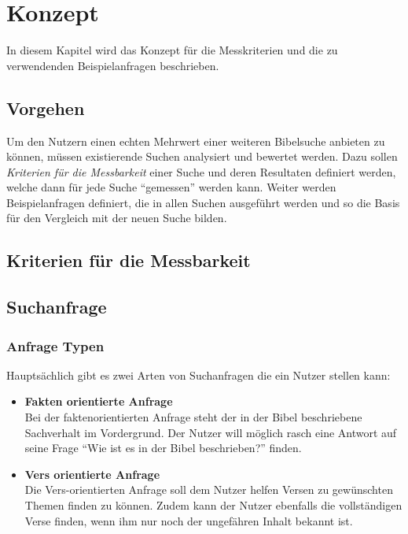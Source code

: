 \chapter{Konzept}
In diesem Kapitel wird das Konzept für die Messkriterien und die zu verwendenden Beispielanfragen beschrieben.

\section{Vorgehen}
Um den Nutzern einen echten Mehrwert einer weiteren Bibelsuche anbieten zu können, müssen existierende Suchen analysiert und bewertet werden.
Dazu sollen \textit{Kriterien für die Messbarkeit} einer Suche und deren Resultaten definiert werden, welche dann für jede Suche "`gemessen"' werden kann.
Weiter werden Beispielanfragen definiert, die in allen Suchen ausgeführt werden und so die Basis für den Vergleich mit der neuen Suche bilden.

\section{Kriterien für die Messbarkeit}

\section{Suchanfrage }

\subsection{Anfrage Typen}
Hauptsächlich gibt es zwei Arten von Suchanfragen die ein Nutzer stellen kann:
\begin{itemize}
	\item \textbf{Fakten orientierte Anfrage}\\
		Bei der faktenorientierten Anfrage steht der in der Bibel beschriebene Sachverhalt im Vordergrund. Der Nutzer will möglich rasch eine Antwort auf seine Frage "`Wie ist es in der Bibel beschrieben?"' finden.

	\item \textbf{Vers orientierte Anfrage}\\
		Die Vers-orientierten Anfrage soll dem Nutzer helfen Versen zu gewünschten Themen finden zu können.
		Zudem kann der Nutzer ebenfalls die vollständigen Verse finden, wenn ihm nur noch der ungefähren Inhalt bekannt ist.
\end{itemize}


